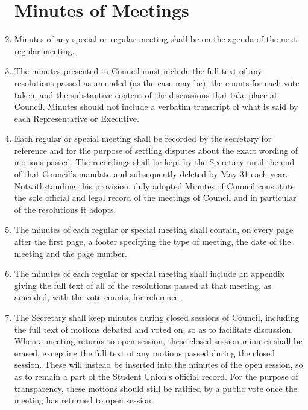 \documentclass[oneside]{book}
\begin{document}
\begin{enumerate}
\section{\label{Minutes_of_Meetings}Minutes of Meetings }
\item Minutes of any special or regular meeting shall be on the agenda of
the next regular meeting. 
\item The minutes presented to Council must include the full text of any resolutions 
passed as amended (as the case may be), the counts for each vote taken, and the 
substantive content of the discussions that take place at Council. Minutes should 
not include a verbatim transcript of what is said by each Representative or Executive.
\item Each regular or special meeting shall be recorded by the secretary for reference 
and for the purpose of settling disputes about the exact wording of motions passed. The 
recordings shall be kept by the Secretary until the end of that Council’s mandate and 
subsequently deleted by May 31 each year. Notwithstanding this provision, duly adopted 
Minutes of Council constitute the sole official and legal record of the meetings of 
Council and in particular of the resolutions it adopts.
\item The minutes of each regular or special meeting shall contain, on every
page after the first page, a footer specifying the type of meeting,
the date of the meeting and the page number. 
\item The minutes of each regular or special meeting shall include an appendix giving 
the full text of all of the resolutions passed at that meeting, as amended, with the 
vote counts, for reference.
\item The Secretary shall keep minutes during closed sessions of Council, including 
the full text of motions debated and voted on, so as to facilitate discussion. When a 
meeting returns to open session, these closed session minutes shall be erased, excepting 
the full text of any motions passed during the closed session. These will instead be inserted 
into the minutes of the open session, so as to remain a part of the Student Union’s official 
record. For the purpose of transparency, these motions should still be ratified by a public 
vote once the meeting has returned to open session.


\end{enumerate}
\end{document}
